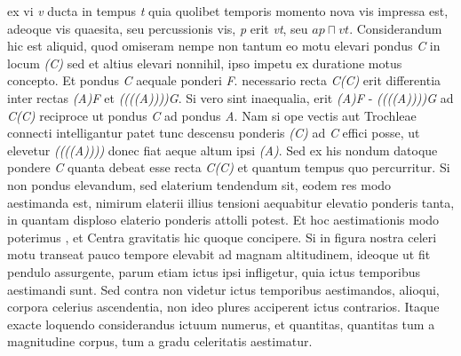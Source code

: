 %
 ex vi \textit{v} ducta in tempus \textit{t} quia quolibet temporis  momento nova vis impressa est, adeoque vis quaesita, seu percussionis vis, \textit{p} erit  \textit{vt}, seu $ap \sqcap vt.$  \pend \pstart Considerandum hic est aliquid, quod omiseram nempe non tantum eo motu elevari pondus \textit{C} in locum \textit{(C)} sed et altius elevari nonnihil, ipso   impetu ex duratione motus concepto. \pend 
\count{}
\pstart  Et  pondus \textit{C} aequale ponderi \textit{F}. necessario recta \textit{C(C)} erit differentia inter rectas  \textit{(A)F} et \textit{((((A))))G}. Si vero sint inaequalia, erit \textit{(A)F} - \textit{((((A))))G} ad  \textit{C(C)} reciproce ut pondus \textit{C} ad pondus \textit{A}. Nam si ope vectis aut Trochleae  connecti intelligantur patet tunc  descensu ponderis \textit{(C)} ad \textit{C} effici posse, ut elevetur \textit{((((A))))} donec fiat   aeque altum ipsi \textit{(A)}.  \pend 
\count{}
\pstart   Sed ex his nondum  datoque pondere \textit{C}   quanta debeat esse recta \textit{C(C)} et quantum tempus quo percurritur. 
 \pend 
\pstart   Si non pondus elevandum, sed elaterium tendendum sit, eodem res modo aestimanda   est, nimirum elaterii illius tensioni aequabitur elevatio ponderis tanta, in quantam   disploso elaterio ponderis attolli potest. Et hoc aestimationis modo poterimus , et Centra gravitatis hic quoque   concipere.  \pend 
\pstart   Si in figura nostra celeri motu transeat  pauco tempore   elevabit ad magnam altitudinem, ideoque ut fit pendulo assurgente, parum etiam ictus ipsi   infligetur, quia ictus temporibus aestimandi sunt. \pend 
\pstart  Sed contra non videtur ictus temporibus aestimandos, alioqui, corpora celerius ascendentia, non ideo plures acciperent ictus   contrarios. Itaque exacte loquendo considerandus ictuum numerus, et quantitas, quantitas tum a magnitudine corpus, tum a gradu celeritatis aestimatur.  
\pend 
\count{}
            \count{}
 


 


 


 


 

